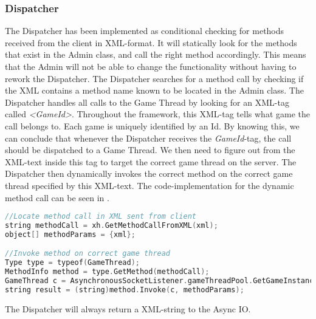 \subsubsection{Dispatcher}
\label{sec:dispImplementation}
The Dispatcher has been implemented as conditional checking for methods received from the client in XML-format. It will statically look for the methods that exist in the Admin class, and call the right method accordingly. This means that the Admin will not be able to change the functionality without having to rework the Dispatcher. The Dispatcher searches for a method call by checking if the XML contains a method name known to be located in the Admin class. The Dispatcher handles all calls to the Game Thread by looking for an XML-tag called \textit{<GameId>}. Throughout the framework, this XML-tag tells what game the call belongs to. Each game is uniquely identified by an Id. By knowing this, we can conclude that whenever the Dispatcher receives the \textit{GameId}-tag, the call should be dispatched to a Game Thread. We then need to figure out from the XML-text inside this tag to target the correct game thread on the server. The Dispatcher then dynamically invokes the correct method on the correct game thread specified by this XML-text. The code-implementation for the dynamic method call can be seen in .

\begin{lstlisting}[caption={Dynamically invoking methods on game threads}, language=C, label={lst:dispdyncall}]
//Locate method call in XML sent from client
string methodCall = xh.GetMethodCallFromXML(xml);
object[] methodParams = {xml};

//Invoke method on correct game thread
Type type = typeof(GameThread);
MethodInfo method = type.GetMethod(methodCall);
GameThread c = AsynchronousSocketListener.gameThreadPool.GetGameInstance(xh.GetGameIdFromXML(xml));
string result = (string)method.Invoke(c, methodParams);
\end{lstlisting}

The Dispatcher will always return a XML-string to the Async IO.
